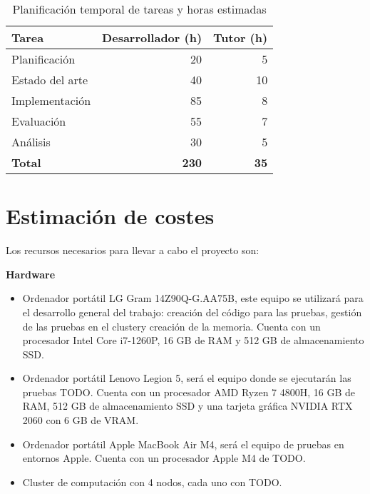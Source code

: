 \begin{table}[!ht]
    \centering
    \setlength{\tabcolsep}{3pt}
    \renewcommand{\arraystretch}{1.1}
    \begin{tabular}{|p{2.5cm}|r|r|}
        \hline
        \textbf{Tarea}  & \textbf{Desarrollador (h)} & \textbf{Tutor (h)} \\
        \hline
        Planificación   & 20                         & 5                  \\
        Estado del arte & 40                         & 10                 \\
        Implementación  & 85                         & 8                  \\
        Evaluación      & 55                         & 7                  \\
        Análisis        & 30                         & 5                  \\
        \hline
        \textbf{Total}  & \textbf{230}               & \textbf{35}        \\
        \hline
    \end{tabular}
    \caption{Planificación temporal de tareas y horas estimadas}
    \label{tab:planificacion-temporal}
\end{table}



\section{Estimación de costes}

Los recursos necesarios para llevar a cabo el proyecto son:


\textbf{Hardware}

\begin{itemize}
    \item Ordenador portátil LG Gram 14Z90Q-G.AA75B, este equipo se utilizará para el desarrollo general del trabajo: creación del código para las pruebas, gestión de las pruebas en el clustery creación de la memoria. Cuenta con un procesador Intel Core i7-1260P, 16 GB de RAM y 512 GB de almacenamiento SSD.

    \item Ordenador portátil Lenovo Legion 5, será el equipo donde se ejecutarán las pruebas {TODO}. Cuenta con un procesador AMD Ryzen 7 4800H, 16 GB de RAM, 512 GB de almacenamiento SSD y una tarjeta gráfica NVIDIA RTX 2060 con 6 GB de VRAM.

    \item Ordenador portátil Apple MacBook Air M4, será el equipo de pruebas en entornos Apple. Cuenta con un procesador Apple M4 de {TODO}.

    \item Cluster de computación con 4 nodos, cada uno con {TODO}.
\end{itemize}

